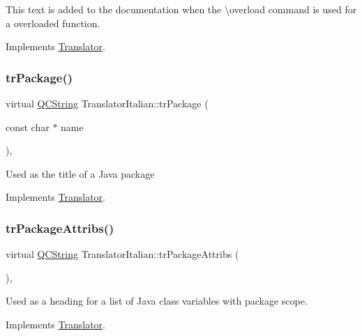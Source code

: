 This text is added to the documentation when the \textbackslash{}overload command is used for a overloaded function. 

Implements \mbox{\hyperlink{class_translator}{Translator}}.

\mbox{\label{class_translator_italian_a9a4086694c96b8514cc9d950e84c183b}} 
\subsubsection{\texorpdfstring{trPackage()}{trPackage()}}
{\footnotesize\ttfamily virtual \mbox{\hyperlink{class_q_c_string}{Q\+C\+String}} Translator\+Italian\+::tr\+Package (\begin{DoxyParamCaption}\item[{const char $\ast$}]{name }\end{DoxyParamCaption})\hspace{0.3cm}{\ttfamily [inline]}, {\ttfamily [virtual]}}

Used as the title of a Java package 

Implements \mbox{\hyperlink{class_translator}{Translator}}.

\mbox{\label{class_translator_italian_a1efcbd6860cdfef389776a1fa84c4bd9}} 
\subsubsection{\texorpdfstring{trPackageAttribs()}{trPackageAttribs()}}
{\footnotesize\ttfamily virtual \mbox{\hyperlink{class_q_c_string}{Q\+C\+String}} Translator\+Italian\+::tr\+Package\+Attribs (\begin{DoxyParamCaption}{ }\end{DoxyParamCaption})\hspace{0.3cm}{\ttfamily [inline]}, {\ttfamily [virtual]}}

Used as a heading for a list of Java class variables with package scope. 

Implements \mbox{\hyperlink{class_translator}{Translator}}.

\mbox{\label{class_translator_italian_a8bb0aa34cffc661455c1505b4248b8ec}} 
